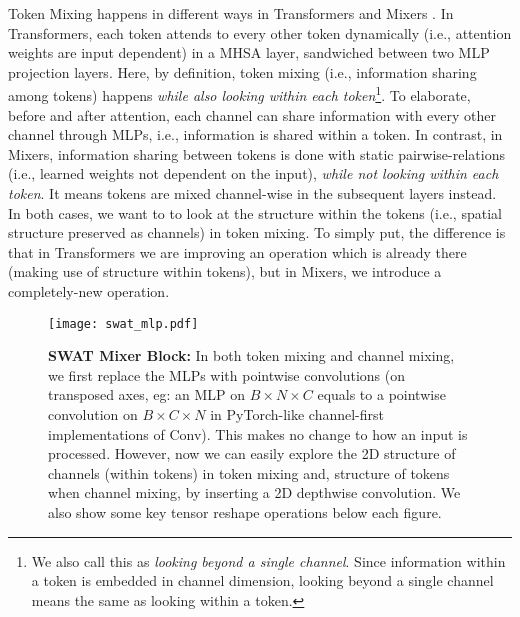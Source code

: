 \documentclass[10pt,twocolumn,letterpaper]{article}
\begin{document}
Token Mixing happens in different ways in Transformers \cite{dosovitskiy2020image, touvron2021deit} and Mixers \cite{tolstikhin2021mixer, touvron2021resmlp}. In Transformers, each token attends to every other token dynamically (i.e., attention weights are input dependent) in a MHSA layer, sandwiched between two MLP projection layers. Here, by definition, token mixing (i.e., information sharing among tokens) happens \textit{while also looking within each token}\footnote{We also call this as \textit{looking beyond a single channel}. Since information within a token is embedded in channel dimension, looking beyond a single channel means the same as looking within a token.}. To elaborate, before and after attention, each channel can share information with every other channel through MLPs, i.e., information is shared within a token. In contrast, in Mixers, information sharing between tokens is done with static pairwise-relations (i.e., learned weights not dependent on the input), \textit{while not looking within each token}. It means tokens are mixed channel-wise in the subsequent layers instead. In both cases, we want to to look at the structure within the tokens (i.e., spatial structure preserved as channels) in token mixing. To simply put, the difference is that in Transformers we are improving an operation which is already there (making use of structure within tokens), but in Mixers, we introduce a completely-new operation.

\begin{figure}[t]
	\centering
	\texttt{[image: swat\_mlp.pdf]}
	\vspace{1.5mm}
	\caption{\textbf{SWAT Mixer Block:} In both token mixing and channel mixing, we first replace the MLPs with pointwise convolutions (on transposed axes, eg: an MLP on $B\times N\times C$ equals to a pointwise convolution on $B\times C\times N$ in PyTorch-like channel-first implementations of Conv). This makes no change to how an input is processed. However, now we can easily explore the 2D structure of channels (within tokens) in token mixing and, structure of tokens when channel mixing, by inserting a 2D depthwise convolution. We also show some key tensor reshape operations below each figure.}
	\label{fig:swat_mixer}
\end{figure}
\end{document}
